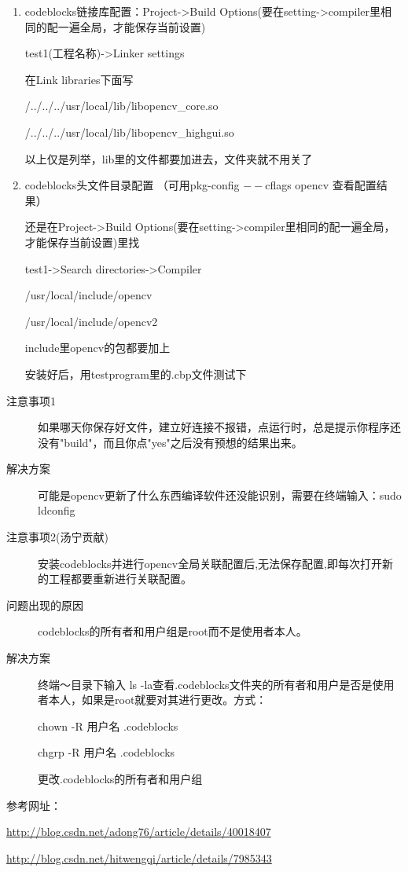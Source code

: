 \documentclass[12pt]{article}
\begin{document}
\begin{enumerate}
\item codeblocks链接库配置：Project->Build Options(要在setting->compiler里相同的配一遍全局，才能保存当前设置)

test1(工程名称)->Linker settings

在Link libraries下面写

/../../../usr/local/lib/libopencv\_core.so

/../../../usr/local/lib/libopencv\_highgui.so

以上仅是列举，lib里的文件都要加进去，文件夹就不用关了

\item codeblocks头文件目录配置 （可用pkg-config $--$cflags opencv 查看配置结果）

还是在Project->Build Options(要在setting->compiler里相同的配一遍全局，才能保存当前设置)里找

test1->Search directories->Compiler

/usr/local/include/opencv

/usr/local/include/opencv2

include里opencv的包都要加上

\begin{comment}

\item CodeBlocks 路文件目录配置

test1->Search directories->Linker

/usr/lib

\end{comment}

安装好后，用testprogram里的.cbp文件测试下

\end{enumerate}

\begin{description}

\item [注意事项1]如果哪天你保存好文件，建立好连接不报错，点运行时，总是提示你程序还没有"build"，而且你点"yes"之后没有预想的结果出来。

\item [解决方案]可能是opencv更新了什么东西编译软件还没能识别，需要在终端输入：sudo ldconfig

\item [注意事项2(汤宁贡献)]安装codeblocks并进行opencv全局关联配置后,无法保存配置,即每次打开新的工程都要重新进行关联配置。

\item [问题出现的原因]codeblocks的所有者和用户组是root而不是使用者本人。

\item [解决方案]终端～目录下输入 ls -la查看.codeblocks文件夹的所有者和用户是否是使用者本人，如果是root就要对其进行更改。方式：

chown -R 用户名 .codeblocks

chgrp -R 用户名 .codeblocks

更改.codeblocks的所有者和用户组

\end{description}

参考网址：

\url{http://blog.csdn.net/adong76/article/details/40018407}
          
\url{http://blog.csdn.net/hitwengqi/article/details/7985343}
\end{document}
